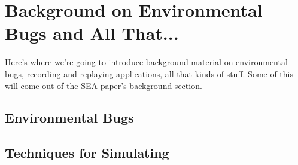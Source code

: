 \chapter{Background on Environmental Bugs and All That...}
\label{chap:background}

Here's where we're going to introduce background material on environmental bugs,
recording and replaying applications, all that kinds of stuff.
Some of this will come out of the SEA paper's background section.

\lipsum[20-22]

\section{Environmental Bugs}
\label{sec:environmentalbugs}


\lipsum[23-26]

\section{Techniques for Simulating}
\label{sec:simulating}

\lipsum[27-30]
